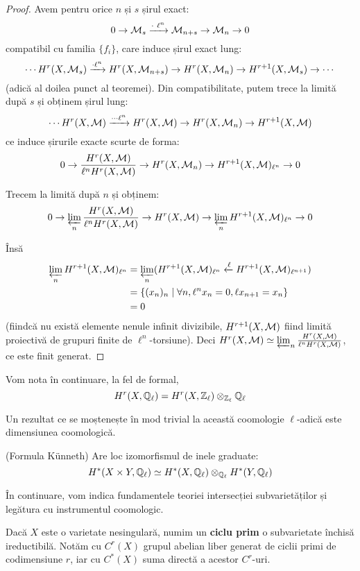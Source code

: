 \documentclass[13pt,openany]{book}
\begin{document}
\begin{proof}
Avem pentru orice $n$ și $s$ șirul exact:
$$0 \rightarrow \mathcal{M}_s \xrightarrow{\cdot\ \ell^n} \mathcal{M}_{n+s} \rightarrow \mathcal{M}_n \rightarrow 0$$
compatibil cu familia $\{f_i\}$, care induce șirul exact lung:
$$\cdots H^r(X,\mathcal{M}_s) \xrightarrow{\cdot \ell^n} H^r(X,\mathcal{M}_{n+s}) \rightarrow H^r(X,\mathcal{M}_n) \rightarrow H^{r+1}(X,\mathcal{M}_s) \rightarrow \cdots$$
(adică al doilea punct al teoremei).
Din compatibilitate, putem trece la limită după $s$ și obținem șirul lung:
$$\cdots H^r(X,\mathcal{M}) \xrightarrow{\cdots \ell^n} H^r(X,\mathcal{M}) \rightarrow H^r(X,\mathcal{M}_n) \rightarrow H^{r+1}(X,\mathcal{M})$$
ce induce șirurile exacte scurte de forma:
$$0 \rightarrow \frac{H^r(X,\mathcal{M})}{\ell^n H^r(X,\mathcal{M})} \rightarrow H^r(X,\mathcal{M}_n) \rightarrow H^{r+1}(X,\mathcal{M})_{\ell^n} \rightarrow 0$$

Trecem la limită după $n$ și obținem:
$$0 \rightarrow \varprojlim_n \frac{H^r(X,\mathcal{M})}{\ell^n H^r(X,\mathcal{M})} \rightarrow H^r(X,\mathcal{M}) \rightarrow \varprojlim_n H^{r+1}(X,\mathcal{M})_{\ell^n} \rightarrow 0$$

Însă
\begin{align*}
\varprojlim_n H^{r+1}(X,\mathcal{M})_{\ell^n} &= \varprojlim_n (H^{r+1}(X,\mathcal{M})_{\ell^n} \xleftarrow{\ell} H^{r+1}(X,\mathcal{M})_{\ell^{n+1}})\\
&=\{(x_n)_n \mid \forall n, \ell^n x_n=0, \ell x_{n+1}=x_n\}\\
&=0
\end{align*}
(fiindcă nu există elemente nenule infinit divizibile, $H^{r+1}(X,\mathcal{M})$ fiind limită proiectivă de grupuri finite de $\ell^n$-torsiune). Deci $H^r(X,\mathcal{M})\simeq \varprojlim_n \frac{H^r(X,\mathcal{M})}{\ell^n H^r(X,\mathcal{M})}$, ce este finit generat.
\end{proof}

Vom nota în continuare, la fel de formal,
$$H^r(X,\mathbb{Q}_\ell) = H^r(X,\mathbb{Z}_\ell) \otimes_{\mathbb{Z}_\ell} \mathbb{Q}_\ell$$

Un rezultat ce se moștenește în mod trivial la această coomologie $\ell$-adică este dimensiunea coomologică.

\begin{teo}
(Formula Künneth) Are loc izomorfismul de inele graduate:
$$H^*(X\times Y,\mathbb{Q}_\ell) \simeq H^*(X,\mathbb{Q}_\ell) \otimes_{\mathbb{Q}_\ell} H^*(Y,\mathbb{Q}_\ell)$$
\end{teo}

În continuare, vom indica fundamentele teoriei intersecției subvarietăților și legătura cu instrumentul coomologic.

Dacă $X$ este o varietate nesingulară, numim un {\bf ciclu prim} o subvarietate închisă ireductibilă. Notăm cu $C^r(X)$ grupul abelian liber generat de ciclii primi de codimensiune $r$, iar cu $C^*(X)$ suma directă a acestor $C^r$-uri.
\end{document}
